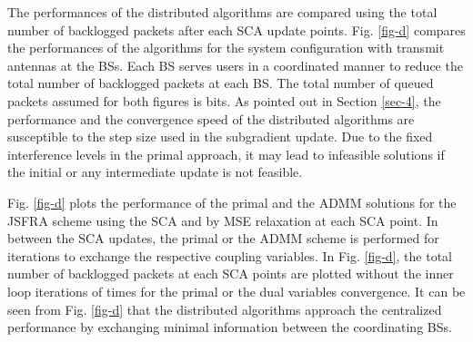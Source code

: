 The performances of the distributed algorithms are compared using the total number of backlogged packets after each \ac{SCA} update points. Fig. \ref{fig-d} compares the performances of the algorithms for the system configuration  with  transmit antennas at the \acp{BS}. Each \ac{BS} serves  users in a coordinated manner to reduce the total number of backlogged packets at each \ac{BS}. The total number of queued packets assumed for both figures is  bits. As pointed out in Section \ref{sec-4}, the performance and the convergence speed of the distributed algorithms are susceptible to the step size used in the subgradient update. Due to the fixed interference levels in the primal approach, it may lead to infeasible solutions if the initial or any intermediate update is not feasible.

Fig. \ref{fig-d} plots the performance of the primal and the \ac{ADMM} solutions for the \ac{JSFRA} scheme using the \ac{SCA} and by \ac{MSE} relaxation at each \ac{SCA} point. In between the \ac{SCA} updates, the primal or the \ac{ADMM} scheme is performed for  iterations to exchange the respective coupling variables. In Fig. \ref{fig-d}, the total number of backlogged packets at each \ac{SCA} points are plotted without the inner loop iterations of  times for the primal or the dual variables convergence. It can be seen from Fig. \ref{fig-d} that the distributed algorithms approach the centralized performance by exchanging minimal information between the coordinating \acp{BS}.

